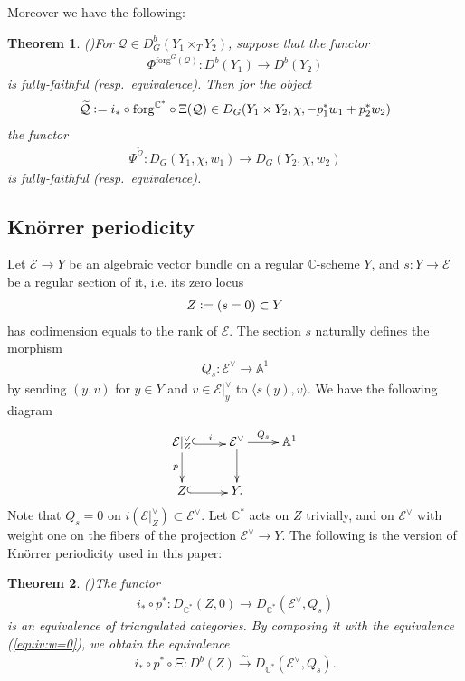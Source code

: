 \documentclass[11pt]{amsart}
\theoremstyle{plain}
\newtheorem{thm}{Theorem}[section]
\newcommand{\eE}{\mathcal{E}}
\newcommand{\qQ}{\mathcal{Q}}
\begin{document}
Moreover we have the following: 
\begin{thm}\emph{(\cite{MR2593258, MR3581302})}\label{thm:FF}
For $\qQ \in D_G^b(Y_1 \times_T Y_2)$, suppose that the functor
\begin{align*}
\Phi^{\mathrm{forg}^G(\qQ)} \colon D^b(Y_1) \to D^b(Y_2)
\end{align*}
is fully-faithful (resp.~equivalence). Then
for the object
\begin{align*}
\widetilde{\qQ} \cneq 
i_{\ast} \circ \mathrm{forg}^{\mathbb{C}^{\ast}} \circ 
\Xi(\qQ) \in D_{G}(Y_1 \times Y_2, \chi, -p_1^{\ast}w_1+p_2^{\ast}w_2)
\end{align*}
the functor
\begin{align*}
\Psi^{\widetilde{\qQ}} \colon 
D_G(Y_1, \chi, w_1) \to D_G(Y_2, \chi, w_2)
\end{align*}
is fully-faithful (resp.~equivalence). 
\end{thm}






\subsection{{K}n\"orrer periodicity}
Let $\eE \to Y$ be an algebraic vector bundle on a regular 
$\mathbb{C}$-scheme $Y$, and 
$s \colon Y \to \eE$ be a regular section of it, i.e. its zero locus 
\begin{align*}
Z\cneq (s=0) \subset Y
\end{align*}
has codimension equals to the rank of $\eE$. 
The section $s$ naturally defines the morphism
\begin{align*}
Q_s \colon 
\eE^{\vee} \to \mathbb{A}^1
\end{align*}
by sending $(y, v)$ for $y \in Y$ and $v \in \eE|_{y}^{\vee}$ 
to $\langle s(y), v \rangle$. 
We have the following diagram
\begin{align*}
\xymatrix{
\eE|_{Z}^{\vee} \ar@<-0.3ex>@{^{(}->}[r]^-{i} \ar[d]_-{p} & \eE^{\vee} \ar[r]^-{Q_s} \ar[d] & \mathbb{A}^1 \\
Z \ar@<-0.3ex>@{^{(}->}[r] & Y. &
}
\end{align*}
Note that $Q_s=0$ on $i(\eE|_{Z}^{\vee}) \subset \eE^{\vee}$. 
Let $\mathbb{C}^{\ast}$ acts on $Z$ trivially, 
and on $\eE^{\vee}$ with weight one 
on the fibers of the projection 
$\eE^{\vee} \to Y$. 
The following is the version of {K}n\"orrer periodicity
used in this paper: 
\begin{thm}\emph{(\cite{MR3071664, MR2982435, MR3631231})}\label{thm:knoer}
The functor 
\begin{align*}
i_{\ast} \circ p^{\ast} \colon D_{\mathbb{C}^{\ast}}(Z, 0) \to D_{\mathbb{C}^{\ast}}(\eE^{\vee}, Q_s)
\end{align*}
is an equivalence of triangulated categories. 
By composing it 
with the equivalence (\ref{equiv:w=0}), we obtain the
equivalence
\begin{align*}
i_{\ast} \circ p^{\ast} \circ \Xi \colon 
D^b(Z) \stackrel{\sim}{\to} D_{\mathbb{C}^{\ast}}(\eE^{\vee}, Q_s).
\end{align*}
\end{thm}
\end{document}
